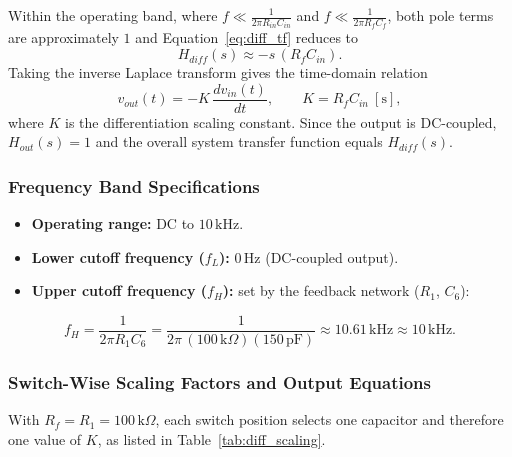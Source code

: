 \documentclass[11pt,a4paper]{article}
\begin{document}
Within the operating band, where $f \ll \frac{1}{2\pi R_{in}C_{in}}$ and $f \ll \frac{1}{2\pi R_fC_f}$, both pole terms are approximately $1$ and Equation~\eqref{eq:diff_tf} reduces to
\begin{equation}
	H_{diff}(s) \approx -s\,(R_fC_{in}).
\end{equation}
Taking the inverse Laplace transform gives the time-domain relation
\begin{equation}
	v_{out}(t) = -K\,\frac{dv_{in}(t)}{dt}, \qquad K = R_fC_{in}\ [\text{s}],
	\label{eq:diff_time}
\end{equation}
where $K$ is the differentiation scaling constant. Since the output is DC-coupled, $H_{out}(s) = 1$ and the overall system transfer function equals $H_{diff}(s)$.

\subsubsection{Frequency Band Specifications}
\begin{itemize}
	\item \textbf{Operating range:} DC to $10\,\text{kHz}$.
	\item \textbf{Lower cutoff frequency ($f_L$):} $0\,\text{Hz}$ (DC-coupled output).
	\item \textbf{Upper cutoff frequency ($f_H$):} set by the feedback network ($R_1$, $C_6$):
\end{itemize}
\begin{equation}
	f_H = \frac{1}{2\pi R_1 C_6} = \frac{1}{2\pi\,(100\,\text{k}\Omega)(150\,\text{pF})} \approx 10.61\,\text{kHz} \approx 10\,\text{kHz}.
\end{equation}

\subsubsection{Switch-Wise Scaling Factors and Output Equations}

With $R_f = R_1 = 100\,\text{k}\Omega$, each switch position selects one capacitor and therefore one value of $K$, as listed in Table~\ref{tab:diff_scaling}.
\end{document}
